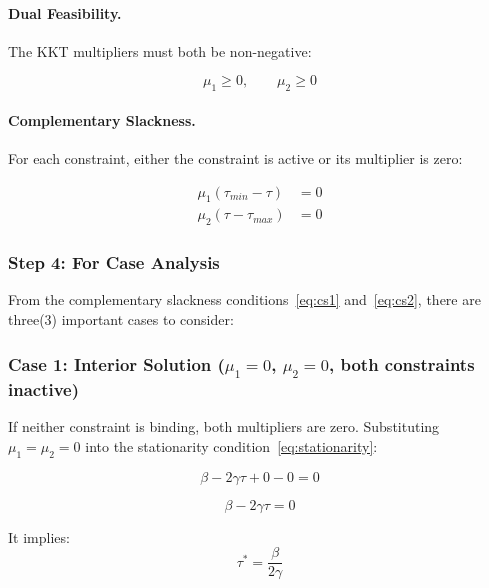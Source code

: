\documentclass[12pt,a4paper]{report}
\theoremstyle{definition}
\theoremstyle{plain}
\theoremstyle{remark}
\newcommand{\taustar}{\tau^{*}}
\begin{document}
	\paragraph{Dual Feasibility.}
	
	The KKT multipliers must both be non-negative:
	
	\begin{equation}
		\mu_1 \geq 0, \qquad \mu_2 \geq 0
		\label{eq:df}
	\end{equation}
	
	\paragraph{Complementary Slackness.}
	
	For each constraint, either the constraint is active or its 
	multiplier is zero:
	
	\begin{align}
		\mu_1(\tau_{min} - \tau) &= 0 \label{eq:cs1}\\
		\mu_2(\tau - \tau_{max}) &= 0 \label{eq:cs2}
	\end{align}
	
	\subsubsection{Step 4: For Case Analysis}
	
	From the complementary slackness 
	conditions~\eqref{eq:cs1} and~\eqref{eq:cs2}, there are 
	three(3) important cases to consider:
	
	\subsubsection*{Case 1: Interior Solution 
		($\mu_1 = 0$, $\mu_2 = 0$, both constraints inactive)}
	
	If neither constraint is binding, both multipliers are zero. 
	Substituting $\mu_1 = \mu_2 = 0$ into the stationarity 
	condition~\eqref{eq:stationarity}:
	
	\begin{equation}
		\beta - 2\gamma\tau + 0 - 0 = 0
	\end{equation}
	
	\begin{equation}
		\beta - 2\gamma\tau = 0
	\end{equation}
	
	It implies:
	\begin{equation}
		\taustar = \frac{\beta}{2\gamma}
		\label{eq:interior}
	\end{equation}
	
\end{document}
